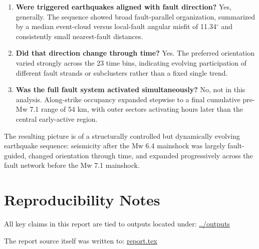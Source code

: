 \documentclass[11pt]{article}
\begin{document}
\begin{enumerate}[label=\arabic*.]
    \item \textbf{Were triggered earthquakes aligned with fault direction?} Yes, generally. The sequence showed broad fault-parallel organization, summarized by a median event-cloud versus local-fault angular misfit of 11.34$^{\circ}$ and consistently small nearest-fault distances.
    \item \textbf{Did that direction change through time?} Yes. The preferred orientation varied strongly across the 23 time bins, indicating evolving participation of different fault strands or subclusters rather than a fixed single trend.
    \item \textbf{Was the full fault system activated simultaneously?} No, not in this analysis. Along-strike occupancy expanded stepwise to a final cumulative pre-Mw 7.1 range of 54 km, with outer sectors activating hours later than the central early-active region.
\end{enumerate}

The resulting picture is of a structurally controlled but dynamically evolving earthquake sequence: seismicity after the Mw 6.4 mainshock was largely fault-guided, changed orientation through time, and expanded progressively across the fault network before the Mw 7.1 mainshock.

\section*{Reproducibility Notes}
All key claims in this report are tied to outputs located under:
\url{../outputs}

The report source itself was written to:
\url{report.tex}
\end{document}
